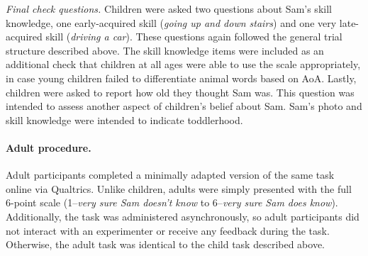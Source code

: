\documentclass[10pt, letterpaper]{article}
\begin{document}
\emph{Final check questions.} Children were asked two questions about
Sam's skill knowledge, one early-acquired skill (\emph{going up and down
stairs}) and one very late-acquired skill (\emph{driving a car}). These
questions again followed the general trial structure described above.
The skill knowledge items were included as an additional check that
children at all ages were able to use the scale appropriately, in case
young children failed to differentiate animal words based on AoA.
Lastly, children were asked to report how old they thought Sam was. This
question was intended to assess another aspect of children's belief
about Sam. Sam's photo and skill knowledge were intended to indicate
toddlerhood.

\hypertarget{adult-procedure.}{%
\paragraph{Adult procedure.}\label{adult-procedure.}}

Adult participants completed a minimally adapted version of the same
task online via Qualtrics. Unlike children, adults were simply presented
with the full 6-point scale (1--\emph{very sure Sam doesn't know} to
6--\emph{very sure Sam does know}). Additionally, the task was
administered asynchronously, so adult participants did not interact with
an experimenter or receive any feedback during the task. Otherwise, the
adult task was identical to the child task described above.
\end{document}
